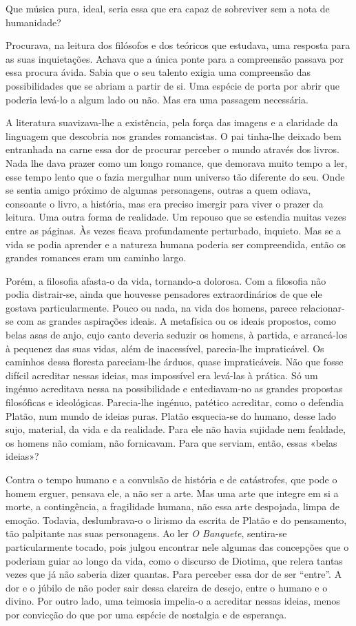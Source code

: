 Que música pura, ideal, seria essa que era capaz de sobreviver sem a
nota de humanidade?

Procurava, na leitura dos filósofos e dos teóricos que estudava, uma
resposta para as suas inquietações. Achava que a única ponte para a
compreensão passava por essa procura ávida. Sabia que o seu talento
exigia uma compreensão das possibilidades que se abriam a partir de si.
Uma espécie de porta por abrir que poderia levá-lo a algum lado ou não.
Mas era uma passagem necessária.

A literatura suavizava-lhe a existência, pela força das imagens e a
claridade da linguagem que descobria nos grandes romancistas. O pai
tinha-lhe deixado bem entranhada na carne essa dor de procurar perceber
o mundo através dos livros. Nada lhe dava prazer como um longo romance,
que demorava muito tempo a ler, esse tempo lento que o fazia mergulhar
num universo tão diferente do seu. Onde se sentia amigo próximo de
algumas personagens, outras a quem odiava, consoante o livro, a
história, mas era preciso imergir para viver o prazer da leitura. Uma
outra forma de realidade. Um repouso que se estendia muitas vezes entre
as páginas. Às vezes ficava profundamente perturbado, inquieto. Mas se a
vida se podia aprender e a natureza humana poderia ser compreendida,
então os grandes romances eram um caminho largo.

Porém, a filosofia afasta-o da vida, tornando-a dolorosa. Com a
filosofia não podia distrair-se, ainda que houvesse pensadores
extraordinários de que ele gostava particularmente. Pouco ou nada, na
vida dos homens, parece relacionar-se com as grandes aspirações ideais.
A metafísica ou os ideais propostos, como belas asas de anjo, cujo canto
deveria seduzir os homens, à partida, e arrancá-los à pequenez das suas
vidas, além de inacessível, parecia-lhe impraticável. Os caminhos dessa
floresta pareciam-lhe árduos, quase impraticáveis. Não que fosse difícil
acreditar nessas ideias, mas impossível era levá-las à prática. Só um
ingénuo acreditava nessa na possibilidade e entediavam-no as grandes
propostas filosóficas e ideológicas. Parecia-lhe ingénuo, patético
acreditar, como o defendia Platão, num mundo de ideias puras. Platão
esquecia-se do humano, desse lado sujo, material, da vida e da
realidade. Para ele não havia sujidade nem fealdade, os homens não
comiam, não fornicavam. Para que serviam, então, essas «belas ideias»?

Contra o tempo humano e a convulsão de história e de catástrofes, que
pode o homem erguer, pensava ele, a não ser a arte. Mas uma arte que
integre em si a morte, a contingência, a fragilidade humana, não essa
arte despojada, limpa de emoção. Todavia, deslumbrava-o o lirismo da
escrita de Platão e do pensamento, tão palpitante nas suas personagens.
Ao ler \emph{O Banquete}, sentira-se particularmente tocado, pois julgou
encontrar nele algumas das concepções que o poderiam guiar ao longo da
vida, como o discurso de Diotima, que relera tantas vezes que já não
saberia dizer quantas. Para perceber essa dor de ser ``entre''. A dor e
o júbilo de não poder sair dessa clareira de desejo, entre o humano e o
divino. Por outro lado, uma teimosia impelia-o a acreditar nessas
ideias, menos por convicção do que por uma espécie de nostalgia e de
esperança.

